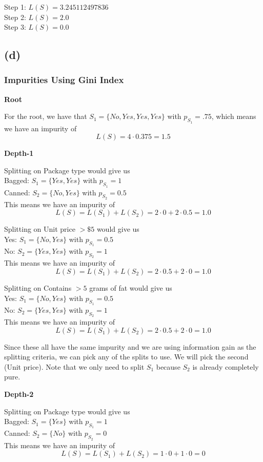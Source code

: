 \documentclass{article}
\begin{document}
\noindent Step 1: $L(S) = 3.245112497836$ \\
Step 2: $L(S) = 2.0$  \\
Step 3: $L(S) = 0.0$ \\

\subsection*{(d)}
\subsubsection*{Impurities Using Gini Index}
\textbf{Root}

For the root, we have that $S_1 = \{ No, Yes, Yes, Yes \}$ with $p_{S_1} = .75$,
which means we have an impurity of
\[ L(S) = 4 \cdot 0.375 = 1.5 \]

\noindent \textbf{Depth-1}

Splitting on Package type would give us \\
Bagged: $S_1 = \{ Yes, Yes \}$ with $p_{S_1} = 1$ \\
Canned: $S_2 = \{ No, Yes \}$ with $p_{S_2} = 0.5$ \\
This means we have an impurity of
\[ L(S) = L(S_1) + L(S_2) = 2 \cdot 0 + 2 \cdot 0.5 = 1.0 \]

Splitting on Unit price $> \$5$ would give us \\
Yes: $S_1 = \{ No, Yes \}$ with $p_{S_1} = 0.5$ \\
No: $S_2 = \{ Yes, Yes \} $ with $p_{S_2} = 1$ \\
This means we have an impurity of
\[ L(S) = L(S_1) + L(S_2) = 2 \cdot 0.5 + 2 \cdot 0 = 1.0 \]

Splitting on Contains $> 5$ grams of fat would give us \\
Yes: $S_1 = \{ No, Yes \}$ with $p_{S_1} = 0.5$ \\
No: $S_2 = \{ Yes, Yes \}$ with $p_{S_2} = 1$ \\
This means we have an impurity of
\[ L(S) = L(S_1) + L(S_2) = 2 \cdot 0.5 + 2 \cdot 0 = 1.0 \]

Since these all have the same impurity and we are using information gain as the splitting
criteria, we can pick any of the splits to use. We will pick the second (Unit price).
Note that we only need to split $S_1$ because $S_2$ is already completely pure.

\noindent \textbf{Depth-2}

Splitting on Package type would give us \\
Bagged: $S_1 = \{ Yes \} $ with $p_{S_1} = 1$ \\
Canned: $S_2 = \{ No \}$ with $p_{S_2} = 0$ \\
This means we have an impurity of
\[ L(S) = L(S_1) + L(S_2) = 1 \cdot 0 + 1 \cdot 0 = 0 \]
\end{document}
